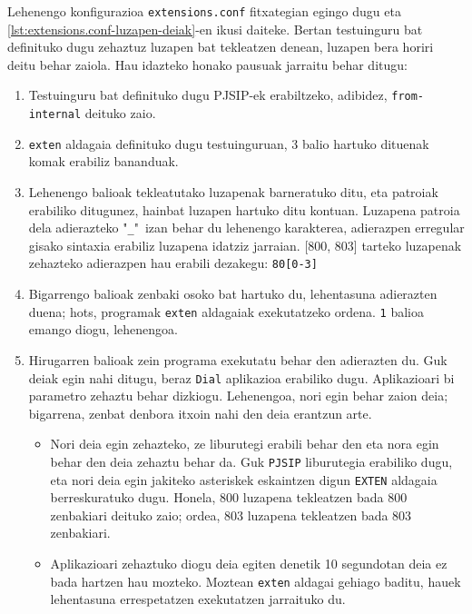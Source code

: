 Lehenengo konfigurazioa \texttt{extensions.conf} fitxategian egingo dugu eta \autoref{lst:extensions.conf-luzapen-deiak}-en ikusi daiteke. Bertan testuinguru bat definituko dugu zehaztuz luzapen bat tekleatzen denean, luzapen bera horiri deitu behar zaiola. Hau idazteko honako pausuak jarraitu behar ditugu:
\begin{enumerate}
    \item Testuinguru bat definituko dugu PJSIP-ek erabiltzeko, adibidez, \texttt{from-internal} deituko zaio.
    \item \texttt{exten} aldagaia definituko dugu testuinguruan, 3 balio hartuko dituenak komak erabiliz bananduak.
    \item Lehenengo balioak tekleatutako luzapenak barneratuko ditu, eta patroiak erabiliko ditugunez, hainbat luzapen hartuko ditu kontuan. Luzapena patroia dela adierazteko "\texttt{_}"\ izan behar du lehenengo karakterea, adierazpen erregular gisako sintaxia erabiliz luzapena idatziz jarraian. [800, 803] tarteko luzapenak zehazteko adierazpen hau erabili dezakegu: \texttt{80[0-3]}
    \item Bigarrengo balioak zenbaki osoko bat hartuko du, lehentasuna adierazten duena; hots, programak \texttt{exten} aldagaiak exekutatzeko ordena. \texttt{1} balioa emango diogu, lehenengoa.
    \item Hirugarren balioak zein programa exekutatu behar den adierazten du. Guk deiak egin nahi ditugu, beraz \texttt{Dial} aplikazioa erabiliko dugu. Aplikazioari bi parametro zehaztu behar dizkiogu. Lehenengoa, nori egin behar zaion deia; bigarrena, zenbat denbora itxoin nahi den deia erantzun arte.
    \begin{itemize}
        \item Nori deia egin zehazteko, ze liburutegi erabili behar den eta nora egin behar den deia zehaztu behar da. Guk \texttt{PJSIP} liburutegia erabiliko dugu, eta nori deia egin jakiteko asteriskek eskaintzen digun \texttt{EXTEN} aldagaia berreskuratuko dugu. Honela, 800 luzapena tekleatzen bada 800 zenbakiari deituko zaio; ordea, 803 luzapena tekleatzen bada 803 zenbakiari.
        \item Aplikazioari zehaztuko diogu deia egiten denetik 10 segundotan deia ez bada hartzen hau mozteko. Moztean \texttt{exten} aldagai gehiago baditu, hauek lehentasuna errespetatzen exekutatzen jarraituko du.
    \end{itemize}
\end{enumerate}

